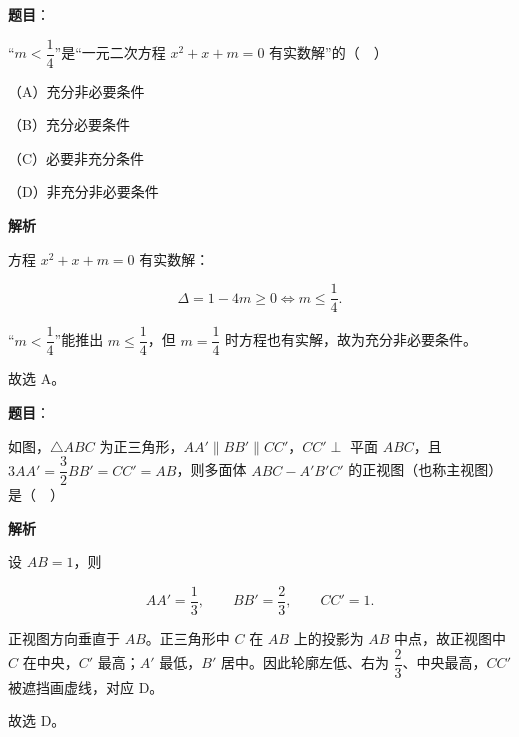 \begin{answer}

\textbf{题目}：

“$m<\dfrac14$”是“一元二次方程 $x^2+x+m=0$ 有实数解”的（　）

（A）充分非必要条件

（B）充分必要条件

（C）必要非充分条件

（D）非充分非必要条件

\textbf{解析}

方程 $x^2+x+m=0$ 有实数解：

\nopagebreak[4]
\[\Delta=1-4m\geqslant0\iff m\leqslant\frac14.\]

“$m<\dfrac14$”能推出 $m\leqslant\dfrac14$，但 $m=\dfrac14$ 时方程也有实解，故为充分非必要条件。

故选 A。


\end{answer}
\begin{answer}

\textbf{题目}：

如图，$\triangle ABC$ 为正三角形，$AA'\parallel BB'\parallel CC'$，$CC'\perp$ 平面 $ABC$，且 $3AA'=\dfrac32BB'=CC'=AB$，则多面体 $ABC-A'B'C'$ 的正视图（也称主视图）是（　）
\nopagebreak[4]
\begin{center}\end{center}
\nopagebreak[4]
\nopagebreak[4]
\begin{center}\end{center}
\nopagebreak[4]
\textbf{解析}

设 $AB=1$，则

\nopagebreak[4]
\[AA'=\frac13,\qquad BB'=\frac23,\qquad CC'=1.\]

正视图方向垂直于 $AB$。正三角形中 $C$ 在 $AB$ 上的投影为 $AB$ 中点，故正视图中 $C$ 在中央，$C'$ 最高；$A'$ 最低，$B'$ 居中。因此轮廓左低、右为 $\dfrac23$、中央最高，$CC'$ 被遮挡画虚线，对应 D。

故选 D。


\end{answer}
